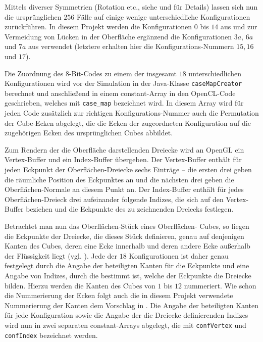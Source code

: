 \noindent Mittels diverser Symmetrien (Rotation etc., siehe \cite{MC} und \cite{MCADD} für Details) lassen sich nun die ursprünglichen $256$ Fälle auf einige wenige unterschiedliche Konfigurationen zurückführen. In diesem Projekt werden die Konfigurationen $0$ bis $14$ aus \cite[S. 165]{MC} und zur Vermeidung von Lücken in der Oberfläche ergänzend die Konfigurationen $3a$, $6a$ und $7a$ aus \cite[S. 247]{MCADD} verwendet (letztere erhalten hier die Konfigurations-Nummern $15, 16$ und $17$).
\smallskip
\pagebreak

\noindent Die Zuordnung des 8-Bit-Codes zu einem der insgesamt $18$ unterschiedlichen Konfigurationen wird vor der Simulation in der Java-Klasse {\tt caseMapCreator} berechnet und anschließend in einem constant-Array in den OpenCL-Code geschrieben, welches mit {\tt case\_map} bezeichnet wird. In diesem Array wird für jeden Code zusätzlich zur richtigen Konfigurations-Nummer auch die Permutation der Cube-Ecken abgelegt, die die Ecken der zugeordneten Konfiguration auf die zugehörigen Ecken des ursprünglichen Cubes abbildet.
\smallskip

\noindent Zum Rendern der die Oberfläche darstellenden Dreiecke wird an OpenGL ein Vertex-Buffer und ein Index-Buffer übergeben. Der Vertex-Buffer enthält für jeden Eckpunkt der Oberflächen-Dreiecke sechs Einträge -- die ersten drei geben die räumliche Position des Eckpunktes an und die nächsten drei geben die Oberflächen-Normale an diesem Punkt an. Der Index-Buffer enthält für jedes Oberflächen-Dreieck drei aufeinander folgende Indizes, die sich auf den Vertex-Buffer beziehen und die Eckpunkte des zu zeichnenden Dreiecks festlegen.
\smallskip


\noindent Betrachtet man nun das Oberflächen-Stück eines Oberflächen- Cubes, so liegen die Eckpunkte der Dreiecke, die dieses Stück definieren, genau auf denjenigen Kanten des Cubes, deren eine Ecke innerhalb und deren andere Ecke außerhalb der Flüssigkeit liegt (vgl. \cite[S. 164]{MC}). Jede der $18$ Konfigurationen ist daher genau festgelegt durch die Angabe der beteiligten Kanten für die Eckpunkte und eine Angabe von Indizes, durch die bestimmt ist, welche der Eckpunkte die Dreiecke bilden. Hierzu werden die Kanten des Cubes von $1$ bis $12$ nummeriert. Wie schon die Nummerierung der Ecken folgt auch die in diesem Projekt verwendete Nummerierung der Kanten dem Vorschlag in \cite[S. 165]{MC}. Die Angabe der beteiligten Kanten für jede Konfiguration sowie die Angabe der die Dreiecke definierenden Indizes wird nun in zwei separaten constant-Arrays abgelegt, die mit {\tt confVertex} und {\tt confIndex} bezeichnet werden.
\smallskip


